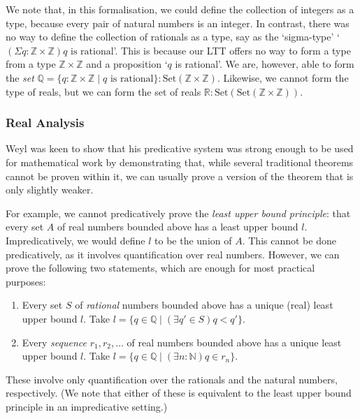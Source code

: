 \documentclass[acmtocl]{acmtrans2m}
\newcommand{\Set}[1]{\mathrm{Set} \left( {#1} \right)}
\begin{document}
We note that, in this formalisation, we could define the collection of integers as a type, because every pair of natural numbers is an integer.  In contrast,
there was no way to define the collection of rationals as a type, say as the `sigma-type' `$(\Sigma q : \mathbb{Z} \times \mathbb{Z}) q \mbox{ is rational}$'.  This is because our LTT offers no way to form a type from a type $\mathbb{Z} \times \mathbb{Z}$ and a proposition `$q$ is rational'.  We are, however,  able to form the \emph{set} $\mathbb{Q} = \{ q : \mathbb{Z} \times \mathbb{Z} \mid q \mbox{ is rational} \} : \Set{\mathbb{Z} \times \mathbb{Z}}$.  Likewise, we cannot form the type of reals, but we can form the set of reals $\mathbb{R} : \Set{\Set{\mathbb{Z} \times \mathbb{Z}}}$.

\subsubsection{Real Analysis}

Weyl was keen to show that his predicative system was strong enough to be used for mathematical work by demonstrating that, while several traditional theorems cannot be proven within it, we can usually prove a version of the theorem that is only slightly weaker.

For example, we cannot predicatively prove the \emph{least upper bound principle}: that every set $A$ of real numbers bounded above has a least upper bound $l$.
 Impredicatively, we would define $l$ to be the union of $A$.
This cannot be done predicatively, as it involves quantification over real numbers.  However, we can prove the following two statements, which are enough for most practical purposes:
\begin{enumerate}
\item
Every set $S$ of \emph{rational} numbers bounded above has a unique (real) least upper bound $l$.  Take
$l = \{ q \in \mathbb{Q} \mid (\exists q' \in S) q < q' \}$.
\item
Every \emph{sequence} $r_1, r_2, \ldots$ of real numbers bounded above has a unique least upper bound $l$.  Take
$l = \{ q \in \mathbb{Q} \mid (\exists n : \mathbb{N}) q \in r_n \}$.
\end{enumerate}
These involve only quantification over the rationals and the natural numbers, respectively.  (We note that either of these is equivalent to the least upper bound principle in an impredicative setting.)
\end{document}
